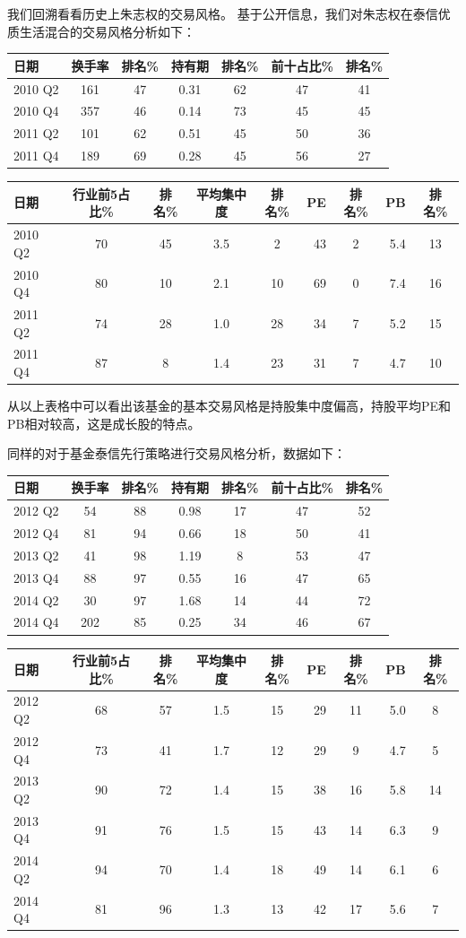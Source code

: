 \documentclass[hyperref,]{ctexart}
\begin{document}
我们回溯看看历史上朱志权的交易风格。
基于公开信息，我们对朱志权在泰信优质生活混合的交易风格分析如下：

\begin{longtable}[]{@{}lcccccc@{}}
\toprule
日期 & 换手率 & 排名\% & 持有期 & 排名\% & 前十占比\% &
排名\%\tabularnewline
\midrule
\endhead
2010 Q2 & 161 & 47 & 0.31 & 62 & 47 & 41\tabularnewline
2010 Q4 & 357 & 46 & 0.14 & 73 & 45 & 45\tabularnewline
2011 Q2 & 101 & 62 & 0.51 & 45 & 50 & 36\tabularnewline
2011 Q4 & 189 & 69 & 0.28 & 45 & 56 & 27\tabularnewline
\bottomrule
\end{longtable}

\begin{longtable}[]{@{}lccccrcrc@{}}
\toprule
日期 & 行业前5占比\% & 排名\% & 平均集中度 & 排名\% & PE & 排名\% & PB &
排名\%\tabularnewline
\midrule
\endhead
2010 Q2 & 70 & 45 & 3.5 & 2 & 43 & 2 & 5.4 & 13\tabularnewline
2010 Q4 & 80 & 10 & 2.1 & 10 & 69 & 0 & 7.4 & 16\tabularnewline
2011 Q2 & 74 & 28 & 1.0 & 28 & 34 & 7 & 5.2 & 15\tabularnewline
2011 Q4 & 87 & 8 & 1.4 & 23 & 31 & 7 & 4.7 & 10\tabularnewline
\bottomrule
\end{longtable}

从以上表格中可以看出该基金的基本交易风格是持股集中度偏高，持股平均PE和PB相对较高，这是成长股的特点。

同样的对于基金泰信先行策略进行交易风格分析，数据如下：

\begin{longtable}[]{@{}lcccccc@{}}
\toprule
日期 & 换手率 & 排名\% & 持有期 & 排名\% & 前十占比\% &
排名\%\tabularnewline
\midrule
\endhead
2012 Q2 & 54 & 88 & 0.98 & 17 & 47 & 52\tabularnewline
2012 Q4 & 81 & 94 & 0.66 & 18 & 50 & 41\tabularnewline
2013 Q2 & 41 & 98 & 1.19 & 8 & 53 & 47\tabularnewline
2013 Q4 & 88 & 97 & 0.55 & 16 & 47 & 65\tabularnewline
2014 Q2 & 30 & 97 & 1.68 & 14 & 44 & 72\tabularnewline
2014 Q4 & 202 & 85 & 0.25 & 34 & 46 & 67\tabularnewline
\bottomrule
\end{longtable}

\begin{longtable}[]{@{}lccccrcrc@{}}
\toprule
日期 & 行业前5占比\% & 排名\% & 平均集中度 & 排名\% & PE & 排名\% & PB &
排名\%\tabularnewline
\midrule
\endhead
2012 Q2 & 68 & 57 & 1.5 & 15 & 29 & 11 & 5.0 & 8\tabularnewline
2012 Q4 & 73 & 41 & 1.7 & 12 & 29 & 9 & 4.7 & 5\tabularnewline
2013 Q2 & 90 & 72 & 1.4 & 15 & 38 & 16 & 5.8 & 14\tabularnewline
2013 Q4 & 91 & 76 & 1.5 & 15 & 43 & 14 & 6.3 & 9\tabularnewline
2014 Q2 & 94 & 70 & 1.4 & 18 & 49 & 14 & 6.1 & 6\tabularnewline
2014 Q4 & 81 & 96 & 1.3 & 13 & 42 & 17 & 5.6 & 7\tabularnewline
\bottomrule
\end{longtable}
\end{document}
